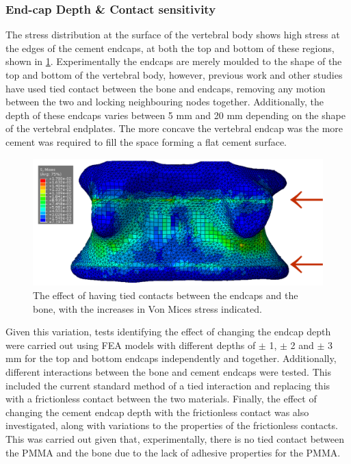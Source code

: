 \subsubsection{End-cap Depth \& Contact sensitivity}

The stress distribution at the surface of the vertebral body shows high stress
at the edges of the cement endcaps, at both the top and bottom of these
regions, shown in \cref{fig:stress_lines}.
Experimentally the endcaps are merely moulded to the shape of the top and
bottom of the vertebral body, however, previous work and other studies have
used tied contact between the bone and endcaps, removing any motion between the
two and locking neighbouring nodes together.
Additionally, the depth of these endcaps varies between 5 mm and 20 mm
depending on the shape of the vertebral endplates.
The more concave the vertebral endcap was the more cement was required to fill
the space forming a flat cement surface.

\begin{figure}[h!]
\centering
\includegraphics[width=.65\textwidth]{Chapters/Chapter_HT_images/stress_lines.pdf}
\caption{The effect of having tied contacts between the endcaps and the bone,
with the increases in Von Mices stress indicated.}
\label{fig:stress_lines}
\end{figure}


Given this variation, tests identifying the effect of changing the endcap depth
were carried out using FEA models with different depths of $\pm$ 1, $\pm$ 2 and
$\pm$ 3 mm for the top and bottom endcaps independently and together.
Additionally, different interactions between the bone and cement endcaps were
tested.
This included the current standard method of a tied interaction and replacing
this with a frictionless contact between the two materials.
Finally, the effect of changing the cement endcap depth with the frictionless
contact was also investigated, along with variations to the properties of the
frictionless contacts.
This was carried out given that, experimentally, there is no tied contact
between the PMMA and the bone due to the lack of adhesive properties for the
PMMA.

